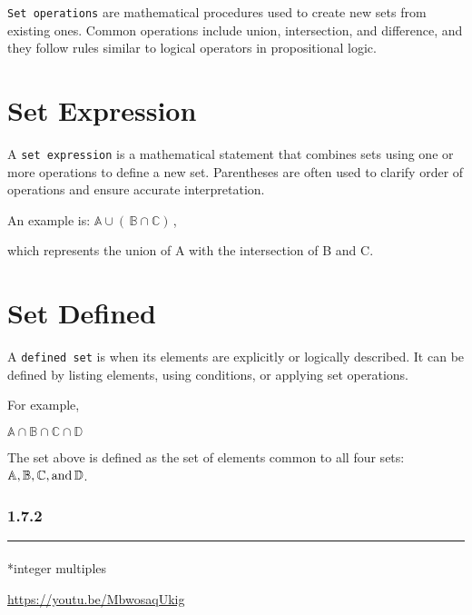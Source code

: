 \documentclass[
  letterpaper,
  DIV=11,
  numbers=noendperiod]{scrreprt}
\makeatletter
\let\oldparagraph\paragraph
\renewcommand{\paragraph}{
    \@ifstar
      \xxxParagraphStar
      \xxxParagraphNoStar
  }
\newcommand{\xxxParagraphStar}[1]{\oldparagraph*{#1}\mbox{}}
\newcommand{\xxxParagraphNoStar}[1]{\oldparagraph{#1}\mbox{}}
\makeatother
\begin{document}
\texttt{Set\ operations} are mathematical procedures used to create new
sets from existing ones. Common operations include union, intersection,
and difference, and they follow rules similar to logical operators in
propositional logic.

\section{Set Expression}

A \texttt{set\ expression} is a mathematical statement that combines
sets using one or more operations to define a new set. Parentheses are
often used to clarify order of operations and ensure accurate
interpretation.

An example is: \(\mathbb{A} \cup (\,\mathbb{B} \cap \mathbb{C})\,\),

which represents the union of A with the intersection of B and C.

\section{Set Defined}

A \texttt{defined\ set} is when its elements are explicitly or logically
described. It can be defined by listing elements, using conditions, or
applying set operations.

For example,

\(\mathbb{A} \cap \mathbb{B} \cap \mathbb{C} \cap \mathbb{D}\)

The set above is defined as the set of elements common to all four sets:
\(\mathbb{A}, \mathbb{B}, \mathbb{C}, \text{and} \thinspace \mathbb{D}\).

\subsubsection*{1.7.2}\label{section-11}

\begin{center}\rule{0.5\linewidth}{0.5pt}\end{center}

\paragraph*{integer multiples}\label{integer-multiples}

\url{https://youtu.be/MbwosaqUkig}
\end{document}
